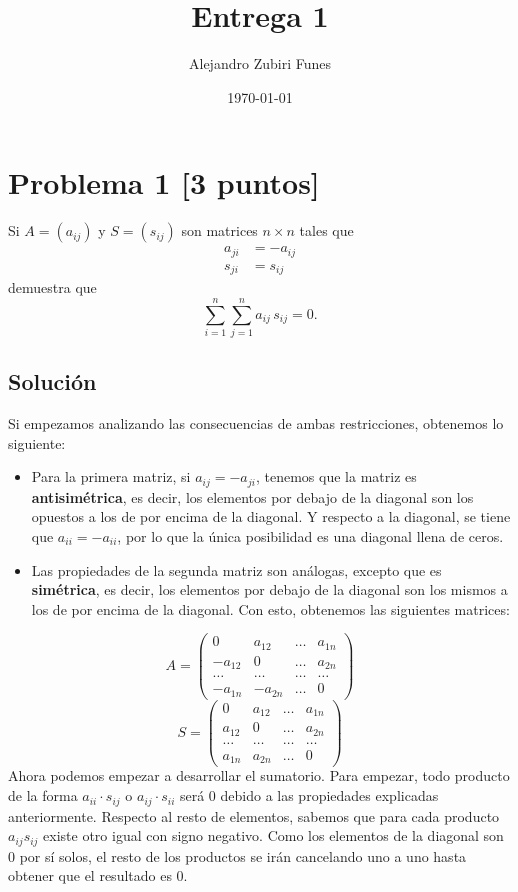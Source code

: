 \documentclass[12pt,reqno]{article}
\title{Entrega 1}
\author{Alejandro Zubiri Funes}
\date{\today}
\begin{document}
	\maketitle
	\section*{Problema 1 [3 puntos]}
	Si $A=(a_{ij})$ y $S=(s_{ij})$ son matrices $n\times n$ tales que
	\begin{align*}
		a_{ji}&=-a_{ij}\\
		s_{ji}&=s_{ij}
	\end{align*}
	demuestra que
	\begin{equation*}
		\sum_{i=1}^{n}\sum_{j=1}^{n} a_{ij}\,s_{ij}=0.
	\end{equation*}
	
	\subsection*{Solución}
Si empezamos analizando las consecuencias de ambas restricciones, obtenemos
lo siguiente:
\begin{itemize}
	\item Para la primera matriz, si $a_{ij}=-a_{ji}$, tenemos que la matriz
		es \textbf{antisimétrica}, es decir, los elementos por debajo de la
		diagonal son los opuestos a los de por encima de la diagonal. Y respecto
		a la diagonal, se tiene que $a_{ii}=-a_{ii}$, por lo que la única
		posibilidad es una diagonal llena de ceros.
	\item Las propiedades de la segunda matriz son análogas, excepto que es
		\textbf{simétrica}, es decir, los elementos por debajo de la diagonal son
		los mismos a los de por encima de la diagonal. Con esto, obtenemos
		las siguientes matrices:
\end{itemize}
\[A=
	\begin{pmatrix} 
		0 & a_{12} & \dots & a_{1n}\\
		-a_{12} & 0 & \dots & a_{2n}\\
		\dots &\dots &\dots &\dots \\
		-a_{1n}&-a_{2n} & \dots & 0
	\end{pmatrix} 
\]
\[S=
	\begin{pmatrix} 
		0 & a_{12} & \dots & a_{1n}\\
		a_{12} & 0 & \dots & a_{2n}\\
		\dots &\dots &\dots &\dots \\
		a_{1n}&a_{2n} & \dots & 0
	\end{pmatrix} 
\]
Ahora podemos empezar a desarrollar el sumatorio. Para empezar, todo producto de
la forma $a_{ii}\cdot s_{ij}$ o $a_{ij}\cdot s_{ii}$ será $0$ debido a las
propiedades explicadas anteriormente. Respecto al resto de elementos, sabemos
que para cada producto $a_{ij}s_{ij}$ existe otro igual con signo negativo.
Como los elementos de la diagonal son $0$ por sí solos, el resto de los
productos se irán cancelando uno a uno hasta obtener que el resultado es $0$. 
	\newpage
	
\end{document}
